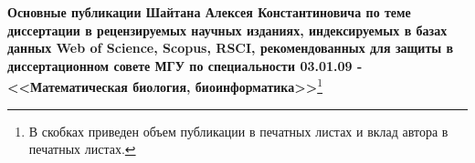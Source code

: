 \medskip
\pagebreak
{} 
\textbf{Основные публикации Шайтана Алексея Константиновича по теме диссертации в рецензируемых научных изданиях, индексируемых в базах данных Web of Science, Scopus, RSCI, рекомендованных для защиты в диссертационном совете МГУ по специальности 03.01.09 - <<Математическая биология, биоинформатика>>}\footnote{В скобках приведен объем публикации в печатных листах и вклад автора в печатных листах.}
\ifnumequal{\value{bibliosel}}{0}{%
  \renewcommand{\bibname}{\large \bibtitleauthor}
  \nocite{*}
  \insertbiblioauthor           %
}{%
}
